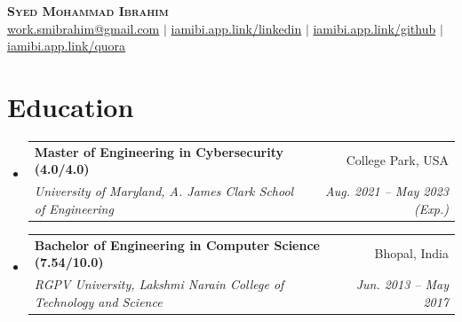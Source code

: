\documentclass[letterpaper,11pt]{article}
\makeatletter
\newcommand{\resumeItem}[1]{
  \item\small{
    {#1 \vspace{-2pt}}
  }
}
\newcommand{\resumeSubheading}[4]{
  \vspace{-2pt}\item
    \begin{tabular*}{0.97\textwidth}[t]{l@{\extracolsep{\fill}}r}
      \textbf{#1} & #2 \\
      \textit{\small#3} & \textit{\small #4} \\
    \end{tabular*}\vspace{-7pt}
}
\newcommand{\resumeSubHeadingListStart}{\begin{itemize}[leftmargin=0.15in, label={}]}
\newcommand{\resumeSubHeadingListEnd}{\end{itemize}}
\newcommand{\resumeItemListStart}{\begin{itemize}}
\newcommand{\resumeItemListEnd}{\end{itemize}\vspace{-5pt}}
\makeatother
\begin{document}

\begin{center}
    \textbf{\Huge \scshape Syed Mohammad Ibrahim} \\ \vspace{1pt}
    \href{mailto:work.smibrahim@gmail.com}{work.smibrahim@gmail.com} $|$
    \href{https://iamibi.app.link/linkedin}{iamibi.app.link/linkedin} $|$
    \href{https://iamibi.app.link/github}{iamibi.app.link/github} $|$
    \href{https://iamibi.app.link/quora}{iamibi.app.link/quora}
\end{center}

\section{Education}
  \resumeSubHeadingListStart
    \resumeSubheading
      {Master of Engineering in Cybersecurity (4.0/4.0)}{College Park, USA}
      {University of Maryland, A. James Clark School of Engineering}{Aug. 2021 -- May 2023 (Exp.)}
    \resumeSubheading
      {Bachelor of Engineering in Computer Science (7.54/10.0)}{Bhopal, India}
      {RGPV University, Lakshmi Narain College of Technology and Science}{Jun. 2013 -- May 2017}
  \resumeSubHeadingListEnd

\end{document}
